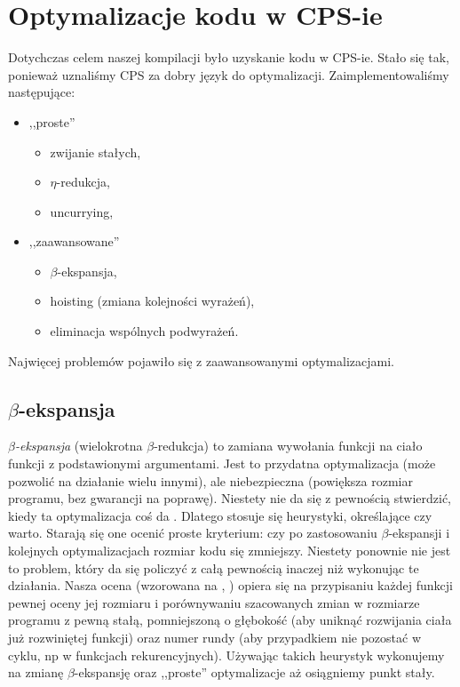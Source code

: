 \documentclass[11pt]{scrartcl}
\begin{document}
\section{Optymalizacje kodu w CPS-ie}
Dotychczas celem naszej kompilacji było uzyskanie kodu w CPS-ie. Stało się tak,
ponieważ uznaliśmy CPS za dobry język do optymalizacji. Zaimplementowaliśmy
następujące:
\begin{itemize}
\item ,,proste'' \begin{itemize}
  \item zwijanie stałych,
  \item $\eta$-redukcja,
  \item uncurrying,
  \end{itemize}
\item ,,zaawansowane'' \begin{itemize}
  \item $\beta$-ekspansja,
  \item hoisting (zmiana kolejności wyrażeń),
  \item eliminacja wspólnych podwyrażeń.
  \end{itemize}
\end{itemize}

Najwięcej problemów
pojawiło się z zaawansowanymi optymalizacjami.

\subsection{$\beta$-ekspansja}
\textit{$\beta$-ekspansja} (wielokrotna $\beta$-redukcja) to zamiana wywołania funkcji na ciało funkcji z
podstawionymi argumentami. Jest to przydatna optymalizacja (może pozwolić na
działanie wielu innymi), ale niebezpieczna (powiększa rozmiar programu, bez
gwarancji na poprawę). Niestety nie da się z pewnością stwierdzić, kiedy ta
optymalizacja coś da \cite[Chapter 7.1: When to do in-line expansion]{Appel}. Dlatego stosuje się heurystyki, określające czy
warto. Starają się one ocenić proste kryterium: czy po zastosowaniu $\beta$-ekspansji
i kolejnych optymalizacjach rozmiar kodu się zmniejszy. Niestety ponownie nie
jest to problem, który da się policzyć z całą pewnością inaczej niż wykonując te
działania. Nasza ocena (wzorowana na \cite[Chapter 7.2: Estimating the
savings]{Appel}, \cite[Chapter 7.3: Runaway Expansion]{Appel}) opiera się na przypisaniu
każdej funkcji pewnej oceny jej rozmiaru i porównywaniu szacowanych zmian w
rozmiarze programu z pewną stałą, pomniejszoną o głębokość (aby uniknąć
rozwijania ciała już rozwiniętej funkcji) oraz numer rundy (aby przypadkiem nie
pozostać w cyklu, np w funkcjach rekurencyjnych). Używając takich heurystyk
wykonujemy na zmianę $\beta$-ekspansję oraz  ,,proste'' optymalizacje
aż osiągniemy punkt stały.
\end{document}
